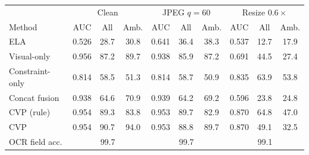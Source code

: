 \begin{tabular}{lccccccccc}
\toprule
 & \multicolumn{3}{c}{Clean} & \multicolumn{3}{c}{JPEG $q{=}60$} & \multicolumn{3}{c}{Resize $0.6\times$}\\
Method & AUC & All & Amb. & AUC & All & Amb. & AUC & All & Amb.\\
\midrule
ELA & 0.526 & 28.7 & 30.8 & 0.641 & 36.4 & 38.3 & 0.537 & 12.7 & 17.9\\
Visual-only & 0.956 & 87.2 & 89.7 & 0.938 & 85.9 & 87.2 & 0.691 & 44.5 & 27.4\\
Constraint-only & 0.814 & 58.5 & 51.3 & 0.814 & 58.7 & 50.9 & 0.835 & 63.9 & 53.8\\
Concat fusion & 0.938 & 64.6 & 70.9 & 0.939 & 64.2 & 69.2 & 0.596 & 23.8 & 24.8\\
CVP (rule) & 0.954 & 89.3 & 83.8 & 0.953 & 89.7 & 82.9 & 0.870 & 64.8 & 47.0\\
CVP & 0.954 & 90.7 & 94.0 & 0.953 & 88.8 & 89.7 & 0.870 & 49.1 & 32.5\\
\midrule
OCR field acc. & \multicolumn{3}{c}{99.7} & \multicolumn{3}{c}{99.7} & \multicolumn{3}{c}{99.1}\\
\bottomrule
\end{tabular}
